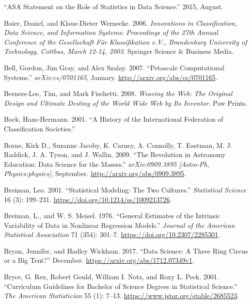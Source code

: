 \documentclass[
  letterpaper,
]{report}
\newlength{\cslhangindent}
\newlength{\cslentryspacingunit} %
\newenvironment{CSLReferences}[2] %
 {%
  \setlength{\parindent}{0pt}
  \ifodd #1
  \let\oldpar\par
  \def\par{\hangindent=\cslhangindent\oldpar}
  \fi
  \setlength{\parskip}{#2\cslentryspacingunit}
 }%
 {}
\begin{document}
\begin{CSLReferences}{1}{0}
\leavevmode{}%
{``ASA Statement on the Role of Statistics in Data Science.''} 2015,
August.

\leavevmode{}%
Baier, Daniel, and Klaus-Dieter Wernecke. 2006. \emph{Innovations in
Classification, Data Science, and Information Systems: Proceedings of
the 27th Annual Conference of the Gesellschaft Für Klassifikation e.V.,
Brandenburg University of Technology, Cottbus, March 12-14, 2003}.
Springer Science \& Business Media.

\leavevmode{}%
Bell, Gordon, Jim Gray, and Alex Szalay. 2007. {``Petascale
Computational Systems.''} \emph{arXiv:cs/0701165}, January.
\url{http://arxiv.org/abs/cs/0701165}.

\leavevmode{}%
Berners-Lee, Tim, and Mark Fischetti. 2008. \emph{Weaving the Web: The
Original Design and Ultimate Destiny of the World Wide Web by Its
Inventor}. Paw Prints.

\leavevmode{}%
Bock, Hans-Hermann. 2001. {``A History of the International Federation
of Classification Societies.''}

\leavevmode{}%
Borne, Kirk D., Suzanne Jacoby, K. Carney, A. Connolly, T. Eastman, M.
J. Raddick, J. A. Tyson, and J. Wallin. 2009. {``The Revolution in
Astronomy Education: Data Science for the Masses.''}
\emph{arXiv:0909.3895 {[}Astro-Ph, Physics:physics{]}}, September.
\url{http://arxiv.org/abs/0909.3895}.

\leavevmode{}%
Breiman, Leo. 2001. {``Statistical Modeling: The Two Cultures.''}
\emph{Statistical Science} 16 (3): 199--231.
\url{https://doi.org/10.1214/ss/1009213726}.

\leavevmode{}%
Breiman, L., and W. S. Meisel. 1976. {``General Estimates of the
Intrinsic Variability of Data in Nonlinear Regression Models.''}
\emph{Journal of the American Statistical Association} 71 (354): 301--7.
\url{https://doi.org/10.2307/2285301}.

\leavevmode{}%
Bryan, Jennifer, and Hadley Wickham. 2017. {``Data Science: A Three Ring
Circus or a Big Tent?''} December.
\url{https://arxiv.org/abs/1712.07349v1}.

\leavevmode{}%
Bryce, G. Rex, Robert Gould, William I. Notz, and Roxy L. Peck. 2001.
{``Curriculum Guidelines for Bachelor of Science Degrees in Statistical
Science.''} \emph{The American Statistician} 55 (1): 7--13.
\url{https://www.jstor.org/stable/2685523}.


\end{CSLReferences}
\end{document}
